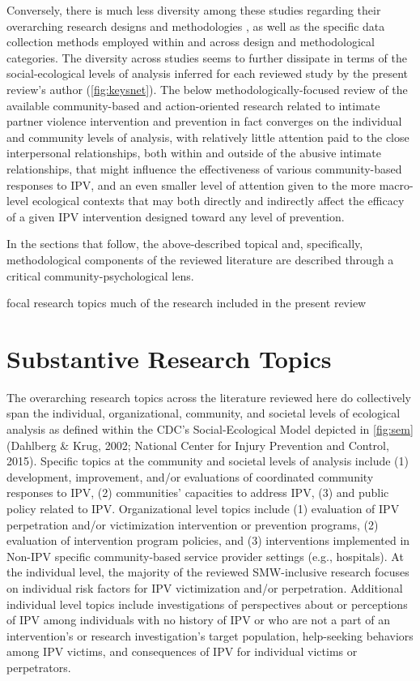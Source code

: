 \documentclass[11pt,]{tufte-book}
\begin{document}
Conversely, there is much less diversity among these studies regarding
their overarching research designs and methodologies , as well as the
specific data collection methods employed within and across design and
methodological categories. The diversity across studies seems to further
dissipate in terms of the social-ecological levels of analysis inferred
for each reviewed study by the present review's author
(\cref{fig:keysnet}). The below
methodologically-focused review of the available community-based and
action-oriented research related to intimate partner violence
intervention and prevention in fact converges on the individual and
community levels of analysis, with relatively little attention paid to
the close interpersonal relationships, both within and outside of the
abusive intimate relationships, that might influence the effectiveness
of various community-based responses to IPV, and an even smaller level
of attention given to the more macro-level ecological contexts that may
both directly and indirectly affect the efficacy of a given IPV
intervention designed toward any level of prevention.

In the sections that follow, the above-described topical and,
specifically, methodological components of the reviewed literature are
described through a critical community-psychological lens.

focal research topics much of the research included in the present
review

\section{Substantive Research Topics}\label{substantive-research-topics}

The overarching research topics across the literature reviewed here do
collectively span the individual, organizational, community, and
societal levels of ecological analysis as defined within the CDC's
Social-Ecological Model depicted in \cref{fig:sem}
(Dahlberg \& Krug, 2002; National Center for Injury Prevention and
Control, 2015). Specific topics at the community and societal levels of
analysis include (1) development, improvement, and/or evaluations of
coordinated community responses to IPV, (2) communities' capacities to
address IPV, (3) and public policy related to IPV. Organizational level
topics include (1) evaluation of IPV perpetration and/or victimization
intervention or prevention programs, (2) evaluation of intervention
program policies, and (3) interventions implemented in Non-IPV specific
community-based service provider settings (e.g., hospitals). At the
individual level, the majority of the reviewed SMW-inclusive research
focuses on individual risk factors for IPV victimization and/or
perpetration. Additional individual level topics include investigations
of perspectives about or perceptions of IPV among individuals with no
history of IPV or who are not a part of an intervention's or research
investigation's target population, help-seeking behaviors among IPV
victims, and consequences of IPV for individual victims or perpetrators.
\end{document}
